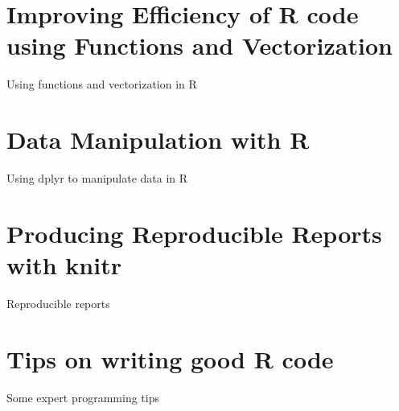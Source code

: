 \documentclass[
]{book}
\begin{document}
\hypertarget{improving-efficiency-of-r-code-using-functions-and-vectorization}{%
\chapter{Improving Efficiency of R code using Functions and Vectorization}\label{improving-efficiency-of-r-code-using-functions-and-vectorization}}

Using functions and vectorization in R

\hypertarget{data-manipulation-with-r}{%
\chapter{Data Manipulation with R}\label{data-manipulation-with-r}}

Using dplyr to manipulate data in R

\hypertarget{producing-reproducible-reports-with-knitr}{%
\chapter{Producing Reproducible Reports with knitr}\label{producing-reproducible-reports-with-knitr}}

Reproducible reports

\hypertarget{tips-on-writing-good-r-code}{%
\chapter{Tips on writing good R code}\label{tips-on-writing-good-r-code}}

Some expert programming tips

  
\end{document}

